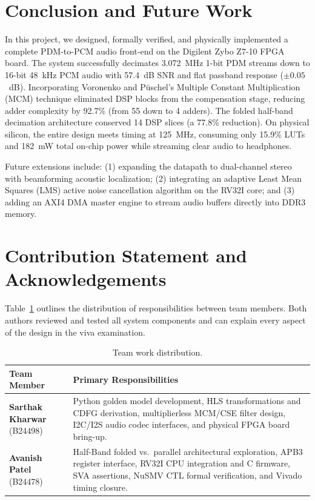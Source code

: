 \documentclass[11pt,a4paper]{article}
\newcommand{\studentA}{Sarthak Kharwar}
\newcommand{\studentB}{Avanish Patel}
\begin{document}
\section{Conclusion and Future Work}
\label{sec:conclusion}

In this project, we designed, formally verified, and physically implemented a complete PDM-to-PCM audio front-end on the Digilent Zybo Z7-10 FPGA board. The system successfully decimates 3.072~MHz 1-bit PDM streams down to 16-bit 48~kHz PCM audio with 57.4~dB SNR and flat passband response ($\pm 0.05$~dB). Incorporating Voronenko and P\"uschel's Multiple Constant Multiplication (MCM) technique eliminated DSP blocks from the compensation stage, reducing adder complexity by 92.7\% (from 55 down to 4 adders). The folded half-band decimation architecture conserved 14 DSP slices (a 77.8\% reduction). On physical silicon, the entire design meets timing at 125~MHz, consuming only 15.9\% LUTs and 182~mW total on-chip power while streaming clear audio to headphones.

Future extensions include: (1) expanding the datapath to dual-channel stereo with beamforming acoustic localization; (2) integrating an adaptive Least Mean Squares (LMS) active noise cancellation algorithm on the RV32I core; and (3) adding an AXI4 DMA master engine to stream audio buffers directly into DDR3 memory.

\section*{Contribution Statement and Acknowledgements}
\label{sec:contrib}

Table~\ref{tab:contrib} outlines the distribution of responsibilities between team members. Both authors reviewed and tested all system components and can explain every aspect of the design in the viva examination.

\begin{table}[H]\centering\small
\caption{Team work distribution.}\label{tab:contrib}
\begin{tabularx}{\linewidth}{@{}lX@{}}
\toprule
Team Member & Primary Responsibilities\\
\midrule
\textbf{\studentA} (B24498) & Python golden model development, HLS transformations and CDFG derivation, multiplierless MCM/CSE filter design, I2C/I2S audio codec interfaces, and physical FPGA board bring-up.\\
\textbf{\studentB} (B24478) & Half-Band folded vs.\ parallel architectural exploration, APB3 register interface, RV32I CPU integration and C firmware, SVA assertions, NuSMV CTL formal verification, and Vivado timing closure.\\
\bottomrule
\end{tabularx}
\end{table}
\end{document}
